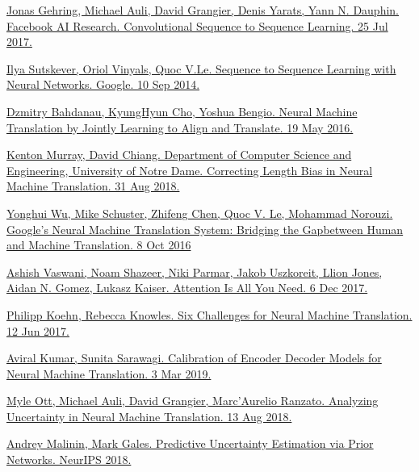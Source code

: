 \documentclass[a4paper,14pt]{extarticle}
\begin{document}
	\begin{thebibliography}{0}		
		\hypertarget{fconv}{}
		\href{https://arxiv.org/pdf/1705.03122.pdf}
		{Jonas Gehring, Michael Auli, David Grangier, Denis Yarats, Yann N. Dauphin. Facebook AI Research. Convolutional Sequence to Sequence Learning. 25 Jul 2017.}
		
		\hypertarget{seq2seq}{}
		\href{https://papers.nips.cc/paper/5346-sequence-to-sequence-learning-with-neural-networks.pdf}
		{Ilya Sutskever, Oriol Vinyals, Quoc V.Le. Sequence to Sequence Learning with Neural Networks. Google. 10 Sep 2014.}
		
		\hypertarget{encdec_att}{}
		\href{https://arxiv.org/pdf/1409.0473.pdf}
		{Dzmitry Bahdanau, KyungHyun Cho, Yoshua Bengio. Neural Machine Translation by Jointly Learning to Align and Translate. 19 May 2016.}
		
		\hypertarget{corr_len_bias}{}
		\href{https://arxiv.org/pdf/1808.10006.pdf}
		{Kenton Murray, David Chiang. Department of Computer Science and Engineering, University of Notre Dame. Correcting Length Bias in Neural Machine Translation. 31 Aug 2018.}
		
		\hypertarget{gnmt}{}
		\href{https://arxiv.org/pdf/1609.08144.pdf}
		{Yonghui Wu, Mike Schuster, Zhifeng Chen, Quoc V. Le, Mohammad Norouzi. Google’s Neural Machine Translation System: Bridging the Gapbetween Human and Machine Translation. 8 Oct 2016}
		
		\hypertarget{transformer}{}
		\href{https://arxiv.org/pdf/1706.03762.pdf}
		{Ashish Vaswani, Noam Shazeer, Niki Parmar, Jakob Uszkoreit, Llion Jones, Aidan N. Gomez, Lukasz Kaiser. Attention Is All You Need. 6 Dec 2017.}
		
		\hypertarget{six_chall}{}
		\href{https://arxiv.org/pdf/1706.03872.pdf}
		{Philipp Koehn, Rebecca Knowles. Six Challenges for Neural Machine Translation. 12 Jun 2017.}
		
		\hypertarget{calibration}{}
		\href{https://arxiv.org/pdf/1903.00802v1.pdf}
		{Aviral Kumar, Sunita Sarawagi. Calibration of Encoder Decoder Models for Neural Machine Translation. 3 Mar 2019.}
		
		\hypertarget{anal_uncertainty}{}
		\href{https://arxiv.org/pdf/1803.00047.pdf}
		{Myle Ott, Michael Auli, David Grangier, Marc'Aurelio Ranzato. Analyzing Uncertainty in Neural Machine Translation. 13 Aug 2018.}
		
		\hypertarget{prior}{}
		\href{https://papers.nips.cc/paper/7936-predictive-uncertainty-estimation-via-prior-networks.pdf}
		{Andrey Malinin, Mark Gales. Predictive Uncertainty Estimation via Prior Networks. NeurIPS 2018.}
	\end{thebibliography}
\end{document}
